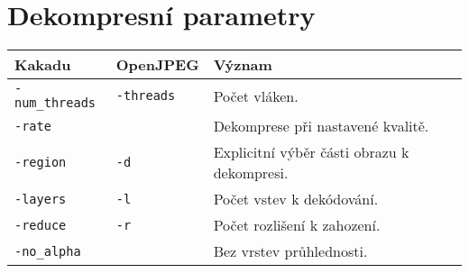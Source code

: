 \chapter{Dekompresní parametry} %

\begin{center}
		\setlength{\tabcolsep}{5pt} %
		\renewcommand{\arraystretch}{1.25} %
			\footnotesize
			\begin{tabular}{|p{3cm}|p{2cm}|p{9cm}|} 
			 \hline
			 \textbf{Kakadu} & \textbf{OpenJPEG} & \textbf{Význam} \\ 
			 \hline \hline
			 
			 \texttt{-num\_threads} & \texttt{-threads} & Počet vláken. \\
			 \texttt{-rate} &  & Dekomprese při nastavené kvalitě. \\
			 \texttt{-region} & \texttt{-d} & Explicitní výběr části obrazu k dekompresi. \\
			 \texttt{-layers} & \texttt{-l} & Počet vstev k dekódování. \\
			 \texttt{-reduce} & \texttt{-r } & Počet rozlišení k zahození. \\
			 \texttt{-no\_alpha} & & Bez vrstev průhlednosti. \\
			 
			  
			\hline
			\end{tabular}
		
		\end{center}
